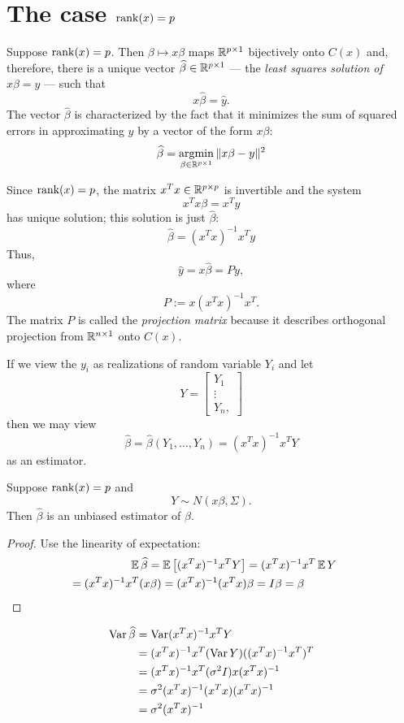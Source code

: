 \documentclass[12pt]{amsart}
\begin{document}
\section{The case $\operatorname{rank}(x)=p$}
Suppose $\operatorname{rank}(x)=p$. Then $\beta\mapsto x\beta$ maps $\mathbb{R}^{p\times 1}$
bijectively onto $C(x)$ and, therefore, there is a unique vector $\widehat\beta\in\mathbb{R}^{p\times 1}$
--- the \emph{least squares solution of} $x\beta=y$ --- such that
\[
    x\hat\beta = \hat y.
\]
The vector $\hat\beta$ is characterized by the fact that it minimizes
the sum of squared errors in approximating $y$ by a vector of the form $x\beta$:
\[
    \widehat \beta = \operatorname*{argmin}_{\beta \in \mathbb{R}^{p\times 1}}\|x\beta - y\|^2
\]

Since $\operatorname{rank}(x)=p$, the matrix $x^Tx\in\mathbb{R}^{p\times p}$ is invertible and the system
\[
    x^Tx\beta = x^Ty
\]
has unique solution; this solution is just $\hat\beta$:
\[
    \hat \beta = (x^Tx)^{-1}x^Ty
\]
Thus,
\[
\hat y = x\hat \beta = Py,
\]
where
\[
    P := x(x^Tx)^{-1}x^T.
\]
The matrix $P$ is called the \emph{projection matrix} because it describes
orthogonal projection from $\mathbb{R}^{n\times 1}$ onto $C(x)$.

If we view the $y_i$ as realizations of random variable $Y_i$ and let
\[
    Y = \begin{bmatrix}
        Y_1\\\vdots\\Y_n,
    \end{bmatrix}
\]
then we may view 
\[
    \hat\beta = \hat\beta(Y_1,\ldots,Y_n) = (x^Tx)^{-1}x^T Y
\]
as an estimator.

\begin{theorem}
    Suppose $\operatorname{rank}(x)=p$ and
    \[
        Y\sim N(x\beta, \Sigma).
    \]
    Then $\hat\beta$ is an unbiased estimator of $\beta$.
\end{theorem}
\begin{proof} Use the linearity of expectation:
    \begin{multline*}
        \qquad\qquad\operatorname{\mathbb{E}}\widehat \beta 
        = \operatorname{\mathbb{E}}\left[(x^Tx)^{-1}x^TY\right] 
        = (x^Tx)^{-1}x^T\operatorname{\mathbb{E}} Y
        \\= (x^Tx)^{-1}x^T (x\beta) 
        = (x^Tx)^{-1}(x^T x)\beta 
        = I\beta 
        = \beta\qquad\qquad\qedhere
    \end{multline*}        
\end{proof}

\begin{align*}
    \operatorname{Var}\widehat\beta &= \operatorname{Var} (x^Tx)^{-1}x^TY\\
    &= (x^Tx)^{-1}x^T(\operatorname{Var} Y)((x^Tx)^{-1}x^T)^T\\
    &= (x^Tx)^{-1}x^T(\sigma^2I)x(x^Tx)^{-1}\\
    &= \sigma^2(x^Tx)^{-1}(x^Tx)(x^Tx)^{-1}\\
    &= \sigma^2(x^Tx)^{-1}
\end{align*}
\end{document}
